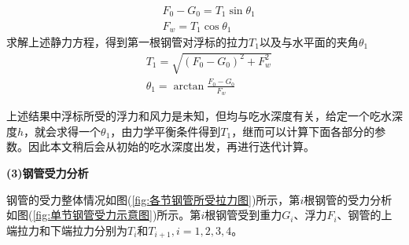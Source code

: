 \documentclass[UTF8]{ctexbook}
\theoremstyle{nonumberplain}
\begin{document}
            \begin{align*}
            & F_0 - G_0 = T_1\sin \theta_1\\
            & F_w = T_1\cos \theta_1
            \end{align*}
            求解上述静力方程，得到第一根钢管对浮标的拉力$T_1$以及与水平面的夹角$\theta_1$
            \begin{align*}
            & T_1 = \sqrt{(F_0-G_0)^2+ F_w^2}\\
            & \theta_1 = \arctan \frac{F_0-G_0}{F_w}
            \end{align*}
            \par
            上述结果中浮标所受的浮力和风力是未知，但均与吃水深度有关，给定一个吃水深度$h$，就会求得一个$\theta_1$，由力学平衡条件得到$T_1$，继而可以计算下面各部分的参数。因此本文稍后会从初始的吃水深度出发，再进行迭代计算。
            \par
            \textbf{(3)钢管受力分析}
            \par
            钢管的受力整体情况如图(\ref{fig:各节钢管所受拉力图})所示，第$i$根钢管的受力分析如图(\ref{fig:单节钢管受力示意图})所示。第$i$根钢管受到重力$G_i$、浮力$F_i$、钢管的上端拉力和下端拉力分别为$T_i$和$T_{i+1},i = 1,2,3,4$。
\end{document}
